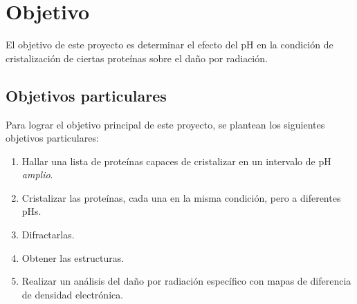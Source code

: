 \chapter{Objetivo}

El objetivo de este proyecto es determinar el efecto del pH en la condición de cristalización de ciertas proteínas sobre el daño por radiación. 
\section{Objetivos particulares}
Para lograr el objetivo principal de este proyecto, se plantean los siguientes objetivos particulares:

\begin{enumerate}
	\item Hallar una lista de proteínas capaces de cristalizar en un intervalo de pH \emph{amplio}.
	\item Cristalizar las proteínas, cada una en la misma condición, pero a diferentes pHs.
	\item Difractarlas.
	\item Obtener las estructuras.
	\item Realizar un análisis del daño por radiación específico con mapas de diferencia de densidad electrónica.
\end{enumerate}	